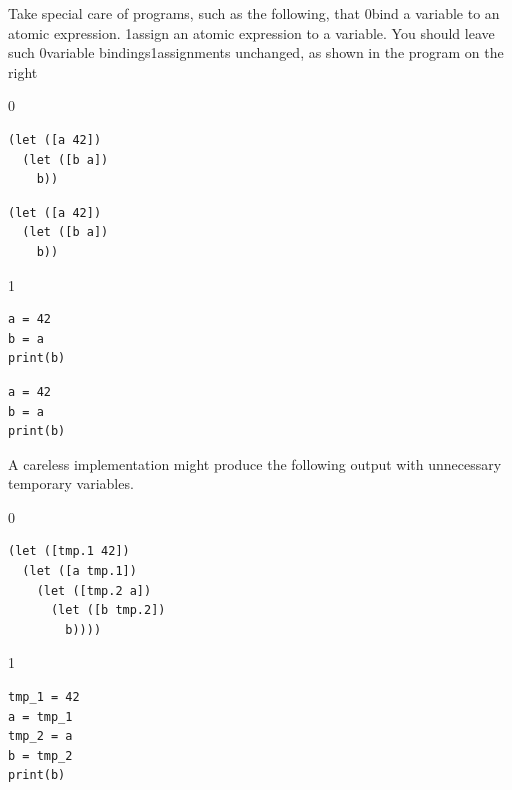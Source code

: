 \documentclass[7x10]{TimesAPriori_MIT}%
\def\racketEd{0}
\def\pythonEd{1}
\def\edition{0}
\newcommand{\racket}[1]{{\if\edition\racketEd{#1}\fi}}
\newcommand{\python}[1]{{\if\edition\pythonEd #1\fi}}
\numberwithin{theorem}{chapter}
\numberwithin{definition}{chapter}
\numberwithin{equation}{chapter}
\begin{document}
Take special care of programs, such as the following, that
%
\racket{bind a variable to an atomic expression.}
%
\python{assign an atomic expression to a variable.}
%
You should leave such \racket{variable bindings}\python{assignments}
unchanged, as shown in the program on the right\\
%
{\if\edition\racketEd
\begin{transformation}
\begin{lstlisting}
(let ([a 42])
  (let ([b a])
    b))
\end{lstlisting}
\compilesto
\begin{lstlisting}
(let ([a 42])
  (let ([b a])
    b))
\end{lstlisting}
\end{transformation}
\fi}
{\if\edition\pythonEd
\begin{transformation}
\begin{lstlisting}
a = 42
b = a
print(b)
\end{lstlisting}
\compilesto
\begin{lstlisting}
a = 42
b = a
print(b)
\end{lstlisting}
\end{transformation}
\fi}
%
\noindent A careless implementation might produce the following output with
unnecessary temporary variables.
\begin{center}
\begin{minipage}{0.4\textwidth}
{\if\edition\racketEd
\begin{lstlisting}
(let ([tmp.1 42])
  (let ([a tmp.1])
    (let ([tmp.2 a])
      (let ([b tmp.2])
        b))))
\end{lstlisting}
\fi}
{\if\edition\pythonEd
\begin{lstlisting}
tmp_1 = 42
a = tmp_1
tmp_2 = a
b = tmp_2
print(b)
\end{lstlisting}
\fi}
\end{minipage}
\end{center}
\end{document}
